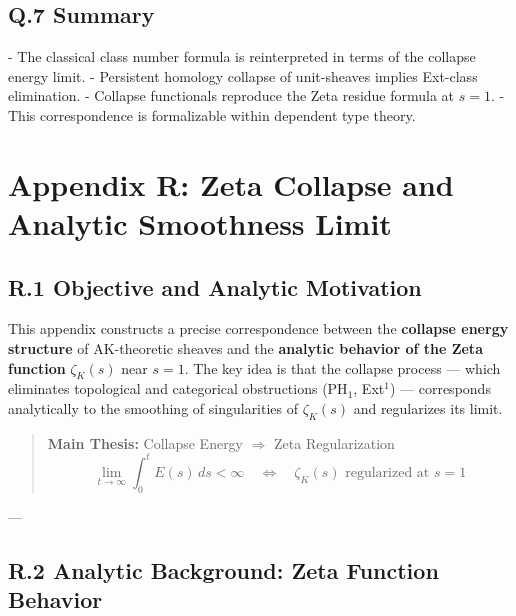 \documentclass[11pt]{article}
\begin{document}
\begin{axiom}
\begin{axiom}
{{\subsection*{Q.7 Summary}

- The classical class number formula is reinterpreted in terms of the collapse energy limit.
- Persistent homology collapse of unit-sheaves implies Ext-class elimination.
- Collapse functionals reproduce the Zeta residue formula at $s = 1$.
- This correspondence is formalizable within dependent type theory.

\begin{center}
\end{center}



\section*{Appendix R: Zeta Collapse and Analytic Smoothness Limit}

\subsection*{R.1 Objective and Analytic Motivation}

This appendix constructs a precise correspondence between the \textbf{collapse energy structure} of AK-theoretic sheaves and the \textbf{analytic behavior of the Zeta function} $\zeta_K(s)$ near $s = 1$.  
The key idea is that the collapse process — which eliminates topological and categorical obstructions (PH$_1$, Ext$^1$) — corresponds analytically to the smoothing of singularities of $\zeta_K(s)$ and regularizes its limit.

\begin{quote}
\textbf{Main Thesis:}  
Collapse Energy $\Rightarrow$ Zeta Regularization  
\[
\lim_{t \to \infty} \int_0^t E(s)\, ds < \infty \quad \Longleftrightarrow \quad \zeta_K(s) \text{ regularized at } s = 1
\]
\end{quote}

---

\subsection*{R.2 Analytic Background: Zeta Function Behavior}

}}
\end{axiom}
\end{axiom}
\end{document}

